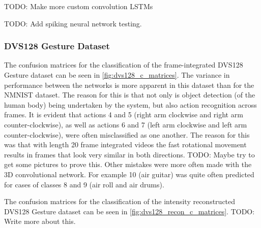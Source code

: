 \color{red} TODO: Make more custom convolution LSTMs \color{black}

\color{red} TODO: Add spiking neural network testing. \color{black}

\subsubsection{DVS128 Gesture Dataset}

The confusion matrices for the classification of the frame-integrated DVS128 Gesture dataset can be seen in \cref{fig:dvs128_c_matrices}. The variance in performance between the networks is more apparent in this dataset than for the NMNIST dataset. The reason for this is that not only is object detection (of the human body) being undertaken by the system, but also action recognition across frames. It is evident that actions 4 and 5 (right arm clockwise and right arm counter-clockwise), as well as actions 6 and 7 (left arm clockwise and left arm counter-clockwise), were often misclassified as one another. The reason for this was that with length 20 frame integrated videos the fast rotational movement results in frames that look very similar in both directions. \color{red} TODO: Maybe try to get some pictures to prove this. \color{black} Other mistakes were more often made with the 3D convolutional network. For example 10 (air guitar) was quite often predicted for cases of classes 8 and 9 (air roll and air drums). 

The confusion matrices for the classification of the intensity reconstructed DVS128 Gesture dataset can be seen in \cref{fig:dvs128_recon_c_matrices}. \color{red} TODO: Write more about this. \color{black}


